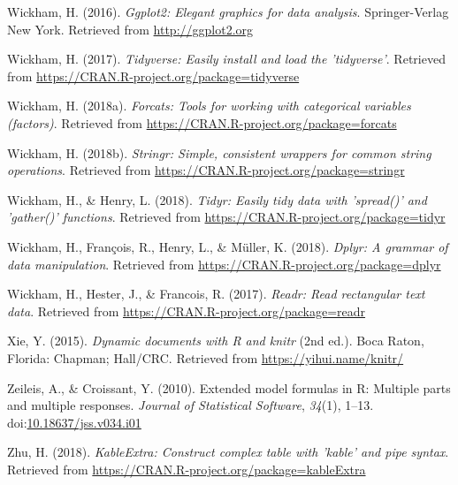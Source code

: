 \documentclass[man]{apa6}
\begin{document}
\hypertarget{ref-R-ggplot2}{}
Wickham, H. (2016). \emph{Ggplot2: Elegant graphics for data analysis}.
Springer-Verlag New York. Retrieved from \url{http://ggplot2.org}

\hypertarget{ref-R-tidyverse}{}
Wickham, H. (2017). \emph{Tidyverse: Easily install and load the
'tidyverse'}. Retrieved from
\url{https://CRAN.R-project.org/package=tidyverse}

\hypertarget{ref-R-forcats}{}
Wickham, H. (2018a). \emph{Forcats: Tools for working with categorical
variables (factors)}. Retrieved from
\url{https://CRAN.R-project.org/package=forcats}

\hypertarget{ref-R-stringr}{}
Wickham, H. (2018b). \emph{Stringr: Simple, consistent wrappers for
common string operations}. Retrieved from
\url{https://CRAN.R-project.org/package=stringr}

\hypertarget{ref-R-tidyr}{}
Wickham, H., \& Henry, L. (2018). \emph{Tidyr: Easily tidy data with
'spread()' and 'gather()' functions}. Retrieved from
\url{https://CRAN.R-project.org/package=tidyr}

\hypertarget{ref-R-dplyr}{}
Wickham, H., François, R., Henry, L., \& Müller, K. (2018). \emph{Dplyr:
A grammar of data manipulation}. Retrieved from
\url{https://CRAN.R-project.org/package=dplyr}

\hypertarget{ref-R-readr}{}
Wickham, H., Hester, J., \& Francois, R. (2017). \emph{Readr: Read
rectangular text data}. Retrieved from
\url{https://CRAN.R-project.org/package=readr}

\hypertarget{ref-R-knitr}{}
Xie, Y. (2015). \emph{Dynamic documents with R and knitr} (2nd ed.).
Boca Raton, Florida: Chapman; Hall/CRC. Retrieved from
\url{https://yihui.name/knitr/}

\hypertarget{ref-R-Formula}{}
Zeileis, A., \& Croissant, Y. (2010). Extended model formulas in R:
Multiple parts and multiple responses. \emph{Journal of Statistical
Software}, \emph{34}(1), 1--13.
doi:\href{https://doi.org/10.18637/jss.v034.i01}{10.18637/jss.v034.i01}

\hypertarget{ref-R-kableExtra}{}
Zhu, H. (2018). \emph{KableExtra: Construct complex table with 'kable'
and pipe syntax}. Retrieved from
\url{https://CRAN.R-project.org/package=kableExtra}

\endgroup
\end{document}
